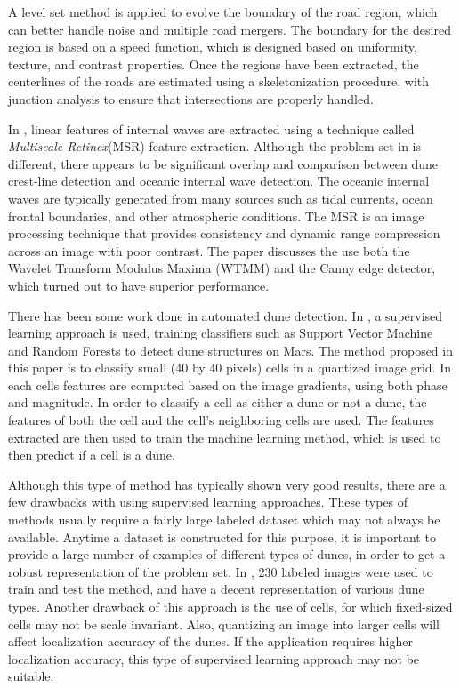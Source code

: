 A level set method is applied to evolve the boundary of the road region, which can better handle noise and multiple road mergers. The boundary for the desired region is based on a speed function, which is designed based on uniformity, texture, and contrast properties. Once the regions have been extracted, the centerlines of the roads are estimated using a skeletonization procedure, with junction analysis to ensure that intersections are properly handled.

In \cite{Extracting_ocean_surface_feature_modis}, linear features of internal waves are extracted using a technique called \emph{Multiscale Retinex}(MSR) feature extraction. Although the problem set in \cite{Extracting_ocean_surface_feature_modis} is different, there appears to be significant overlap and comparison between dune crest-line detection and oceanic internal wave detection. The oceanic internal waves are typically generated from many sources such as tidal currents, ocean frontal boundaries, and other atmospheric conditions. The MSR is an image processing technique that provides consistency and dynamic range compression across an image with poor contrast. The paper discusses the use both the Wavelet Transform Modulus Maxima (WTMM) and the Canny edge detector, which turned out to have superior performance.

There has been some work done in automated dune detection. In \cite{BandeiraMarques}, a supervised learning approach is used, training classifiers such as Support Vector Machine and Random Forests to detect dune structures on Mars. The method proposed in this paper is to classify small (40 by 40 pixels) cells in a quantized image grid. In each cells features are computed based on the image gradients, using both phase and magnitude. In order to classify a cell as either a dune or not a dune, the features of both the cell and the cell's neighboring cells are used. The features extracted are then used to train the machine learning method, which is used to then predict if a cell is a dune.

Although this type of method has typically shown very good results, there are a few drawbacks with using supervised learning approaches. These types of methods usually require a fairly large labeled dataset which may not always be available. Anytime a dataset is constructed for this purpose, it is important to provide a large number of examples of different types of dunes, in order to get a robust representation of the problem set. In \cite{BandeiraMarques}, 230 labeled images were used to train and test the method, and have a decent representation of various dune types. Another drawback of this approach is the use of cells, for which fixed-sized cells may not be scale invariant. Also, quantizing an image into larger cells	will affect localization accuracy of the dunes. If the application requires higher localization accuracy, this type of supervised learning approach may not be suitable.


